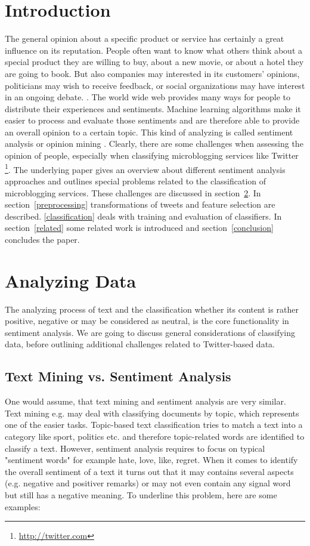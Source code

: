 \documentclass{acm_proc_article-sp}
\begin{document}
\section{Introduction} The general opinion about a specific product or service
has certainly a great influence on its reputation. People often want to know
what others think about a special product they are willing to buy, about a new
movie, or about a hotel they are going to book. But also companies may
interested in its customers' opinions, politicians may wish to receive
feedback, or social organizations may have interest in an ongoing debate.
\cite{pak2010twitter}.  The world wide web provides many ways for people to
distribute their experiences and sentiments. Machine learning algorithms make
it easier to process and evaluate those sentiments and are therefore able to
provide an overall opinion to a certain topic. This kind of analyzing is called
sentiment analysis or opinion mining \cite{liu2010sentimentanalysis,
pang2008opinion}. Clearly, there are some challenges when assessing the opinion
of people, especially when classifying microblogging services like Twitter
\footnote{\url{http://twitter.com}}. The underlying paper gives an overview
about different sentiment analysis approaches and outlines special problems
related to the classification of microblogging services. These challenges are
discussed in section~\ref{analyzingdata}. In section~\ref{preprocessing}
transformations of tweets and feature selection are described.
\ref{classification} deals with training and evaluation of classifiers. In
section~\ref{related} some related work is introduced and
section~\ref{conclusion} concludes the paper.


\section{Analyzing Data} \label{analyzingdata} The analyzing process of text
and the classification whether its content is rather positive, negative or may
be considered as neutral, is the core functionality in sentiment analysis. We
are going to discuss general considerations of classifying data, before
outlining additional challenges related to Twitter-based data.

\subsection{Text Mining vs. Sentiment Analysis} One would assume, that text
mining and sentiment analysis are very similar. Text mining e.g. may deal with
classifying documents by topic, which represents one of the easier tasks.
Topic-based text classification tries to match a text into a category like
sport, politics etc. and therefore topic-related words are identified to
classify a text. However, sentiment analysis requires to focus on typical
"sentiment words" for example hate, love, like, regret.  When it comes to
identify the overall sentiment of a text it turns out that it may contains
several aspects (e.g. negative and positiver remarks) or may not even contain
any signal word but still has a negative meaning.  To underline this problem,
here are some examples:
\end{document}
